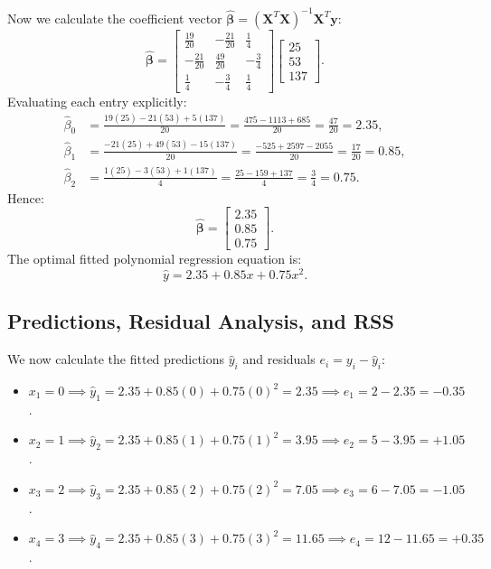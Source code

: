 \documentclass[11pt,a4paper]{article}
\numberwithin{equation}{section}
\newcommand{\X}{\mathbf{X}}
\newcommand{\y}{\mathbf{y}}
\newcommand{\bhat}{\widehat{\boldsymbol{\beta}}}
\begin{document}
Now we calculate the coefficient vector $\bhat = (\X^T\X)^{-1}\X^T\y$:
\begin{equation}
  \bhat = \begin{bmatrix}
    \frac{19}{20} & -\frac{21}{20} & \frac{1}{4} \\[4pt]
    -\frac{21}{20} & \frac{49}{20} & -\frac{3}{4} \\[4pt]
    \frac{1}{4} & -\frac{3}{4} & \frac{1}{4}
  \end{bmatrix}
  \begin{bmatrix}
    25 \\ 53 \\ 137
  \end{bmatrix}.
\end{equation}
Evaluating each entry explicitly:
\begin{align*}
  \hat{\beta}_0 &= \frac{19(25) - 21(53) + 5(137)}{20} = \frac{475 - 1113 + 685}{20} = \frac{47}{20} = \mathbf{2.35}, \\
  \hat{\beta}_1 &= \frac{-21(25) + 49(53) - 15(137)}{20} = \frac{-525 + 2597 - 2055}{20} = \frac{17}{20} = \mathbf{0.85}, \\
  \hat{\beta}_2 &= \frac{1(25) - 3(53) + 1(137)}{4} = \frac{25 - 159 + 137}{4} = \frac{3}{4} = \mathbf{0.75}.
\end{align*}
Hence:
\begin{equation}
  \boxed{\bhat = \begin{bmatrix} 2.35 \\ 0.85 \\ 0.75 \end{bmatrix}.}
\end{equation}
The optimal fitted polynomial regression equation is:
\begin{equation}
  \boxed{\hat{y} = 2.35 + 0.85x + 0.75x^2.}
\end{equation}

\subsection{Predictions, Residual Analysis, and RSS}
We now calculate the fitted predictions $\hat{y}_i$ and residuals $e_i = y_i - \hat{y}_i$:
\begin{itemize}
  \item $x_1 = 0 \implies \hat{y}_1 = 2.35 + 0.85(0) + 0.75(0)^2 = 2.35 \implies e_1 = 2 - 2.35 = \mathbf{-0.35}$.
  \item $x_2 = 1 \implies \hat{y}_2 = 2.35 + 0.85(1) + 0.75(1)^2 = 3.95 \implies e_2 = 5 - 3.95 = \mathbf{+1.05}$.
  \item $x_3 = 2 \implies \hat{y}_3 = 2.35 + 0.85(2) + 0.75(2)^2 = 7.05 \implies e_3 = 6 - 7.05 = \mathbf{-1.05}$.
  \item $x_4 = 3 \implies \hat{y}_4 = 2.35 + 0.85(3) + 0.75(3)^2 = 11.65 \implies e_4 = 12 - 11.65 = \mathbf{+0.35}$.
\end{itemize}
\end{document}
